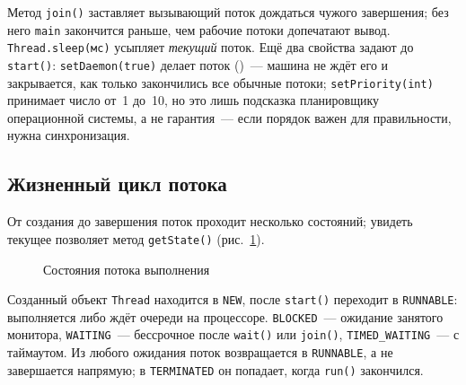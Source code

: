 Метод \texttt{join()} заставляет вызывающий поток дождаться чужого завершения;
без него \texttt{main} закончится раньше, чем рабочие потоки допечатают вывод.
\texttt{Thread.sleep(мс)} усыпляет \emph{текущий} поток. Ещё два свойства задают
до \texttt{start()}: \texttt{setDaemon(true)} делает поток 
()~--- машина не ждёт его и закрывается, как только закончились все
обычные потоки; \texttt{setPriority(int)} принимает число от~1 до~10, но это
лишь подсказка планировщику операционной системы, а не гарантия~--- если порядок
важен для правильности, нужна синхронизация.

\subsection{Жизненный цикл потока}

От создания до завершения поток проходит несколько состояний; увидеть текущее
позволяет метод \texttt{getState()} (рис.~\ref{fig:05-5}).

\begin{figure}[htbp]\centering
{}
\caption{Состояния потока выполнения}\label{fig:05-5}
\end{figure}

Созданный объект \texttt{Thread} находится в \texttt{NEW}, после
\texttt{start()} переходит в \texttt{RUNNABLE}: выполняется либо ждёт очереди на
процессоре. \texttt{BLOCKED}~--- ожидание занятого монитора,
\texttt{WAITING}~--- бессрочное после \texttt{wait()} или \texttt{join()},
\texttt{TIMED\_WAITING}~--- с таймаутом. Из любого ожидания поток возвращается в
\texttt{RUNNABLE}, а не завершается напрямую; в \texttt{TERMINATED} он попадает,
когда \texttt{run()} закончился.


